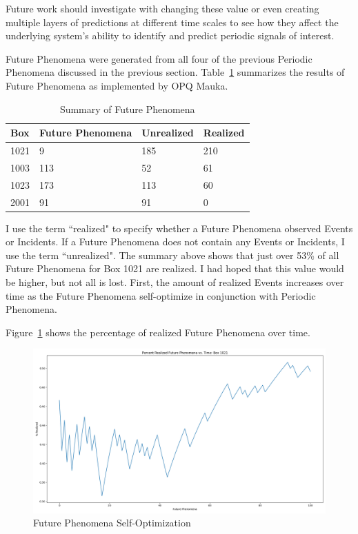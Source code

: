 Future work should investigate with changing these value or even creating multiple layers of predictions at different time scales to see how they affect the underlying system's ability to identify and predict periodic signals of interest.

Future Phenomena were generated from all four of the previous Periodic Phenomena discussed in the previous section. Table~\ref{table:future_summary} summarizes the results of Future Phenomena as implemented by OPQ Mauka.

\begin{table}[H]
    \centering
    \caption{Summary of Future Phenomena}
    \begin{tabularx}{\textwidth}{llll}
        \toprule
        \textbf{Box} & \textbf{Future Phenomena} &\textbf{Unrealized} & \textbf{Realized} \\
        \midrule
        1021 & 9 & 185 & 210 \\
        1003 & 113 & 52 & 61 \\
        1023 & 173 & 113 & 60 \\
        2001 & 91 & 91 & 0 \\
        \bottomrule
    \end{tabularx}
    \label{table:future_summary}
\end{table}

I use the term ``realized" to specify whether a Future Phenomena observed Events or Incidents. If a Future Phenomena does not contain any Events or Incidents, I use the term ``unrealized". The summary above shows that just over 53\% of all Future Phenomena for Box 1021 are realized. I had hoped that this value would be higher, but not all is lost. First, the amount of realized Events increases over time as the Future Phenomena self-optimize in conjunction with Periodic Phenomena.

Figure~\ref{fig:future_opt} shows the percentage of realized Future Phenomena over time.

\begin{figure}[h]
    \centering
    \includegraphics[width=\linewidth]{figures/future_opt.png}
    \caption{Future Phenomena Self-Optimization}
    \label{fig:future_opt}
\end{figure}

